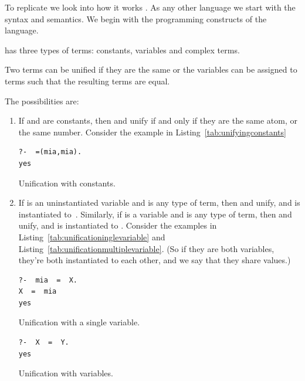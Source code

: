 \documentclass[thesis-solanki.tex]{subfiles}
\begin{document}
To replicate  we look into how it works .
%
As any other language we start with the syntax and semantics.
We begin with the programming constructs of the language.

 has three types of terms: constants, variables and complex terms.

Two terms can be unified if they are the same or the variables can be assigned to terms such that the resulting
terms are equal.

The possibilities are:
\begin{enumerate}
\item If  and  are constants, then  and  unify if and only if they
  are the same atom, or the same number. Consider the example in Listing~\ref{tab:unifyingconstants}
\par
\begin{code-list}[H]
\begin{verbatim}
?-  =(mia,mia).
yes
\end{verbatim}
\caption{Unification with constants.}
\label{tab:unifyingconstants}
\end{code-list}


\item If  is an uninstantiated variable and  is any type of term, then 
  and  unify, and  is instantiated to \,.
  Similarly, if  is a variable and  is any type of term, then  and 
  unify, and  is instantiated to .
  Consider the examples in Listing~\ref{tab:unificationinglevariable} and 
  Listing~\ref{tab:unificationmultiplevariable}. (So if they are both 
variables, they're both instantiated to each other, and we say that they share values.)
\par
\begin{code-list}[H]
\begin{verbatim}
?-  mia  =  X.
X  =  mia
yes
\end{verbatim}
\caption{Unification with a single variable.}
\label{tab:unificationsinglevariable}
\end{code-list}

\begin{code-list}[H]
\begin{verbatim}
?-  X  =  Y.
yes
\end{verbatim}
\caption{Unification with variables.}
\label{tab:unificationmultiplevariable}
\end{code-list}



\end{enumerate}
\end{document}
